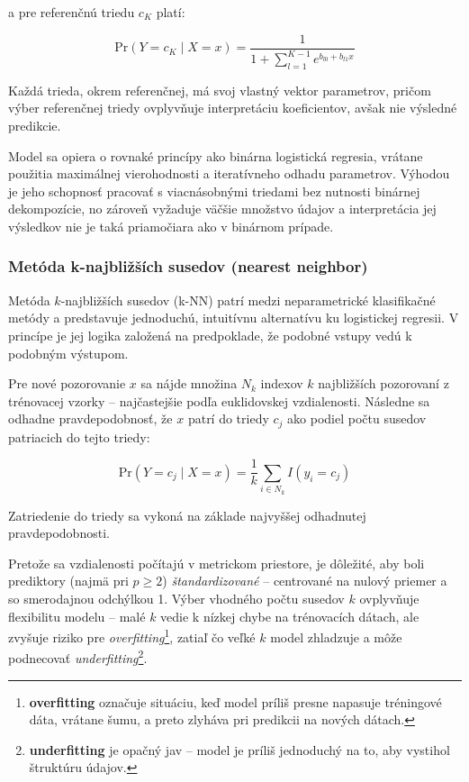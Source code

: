 a pre referenčnú triedu $c_K$ platí:

\begin{equation}
\mathrm{Pr}(Y = c_K \mid X = x) = \frac{1}{1 + \sum\limits_{l=1}^{K-1} e^{b_{l0} + b_{l1} x}}
\end{equation}

Každá trieda, okrem referenčnej, má svoj vlastný vektor parametrov, pričom výber referenčnej triedy ovplyvňuje interpretáciu koeficientov, avšak nie výsledné predikcie.

Model sa opiera o rovnaké princípy ako binárna logistická regresia, vrátane použitia maximálnej vierohodnosti a iteratívneho odhadu parametrov. Výhodou je jeho schopnosť pracovať s viacnásobnými triedami bez nutnosti binárnej dekompozície, no zároveň vyžaduje väčšie množstvo údajov a interpretácia jej výsledkov nie je taká priamočiara ako v binárnom prípade.

\subsubsection{Metóda k-najbližších susedov (nearest neighbor)}
\label{subsubsec:knn}

Metóda $k$-najbližších susedov (k-NN) patrí medzi neparametrické klasifikačné metódy a predstavuje jednoduchú, intuitívnu alternatívu ku logistickej regresii. V princípe je jej logika založená na predpoklade, že podobné vstupy vedú k podobným výstupom.

Pre nové pozorovanie $x$ sa nájde množina $N_k$ indexov $k$ najbližších pozorovaní z trénovacej vzorky – najčastejšie podľa euklidovskej vzdialenosti. Následne sa odhadne pravdepodobnosť, že $x$ patrí do triedy $c_j$ ako podiel počtu susedov patriacich do tejto triedy:

\begin{equation}
\mathrm{Pr}(Y = c_j \mid X = x) = \frac{1}{k} \sum_{i \in N_k} I(y_i = c_j)
\end{equation}

Zatriedenie do triedy sa vykoná na základe najvyššej odhadnutej pravdepodobnosti.

Pretože sa vzdialenosti počítajú v metrickom priestore, je dôležité, aby boli prediktory (najmä pri $p \geq 2$) \textit{štandardizované} – centrované na nulový priemer a so smerodajnou odchýlkou 1. Výber vhodného počtu susedov $k$ ovplyvňuje flexibilitu modelu – malé $k$ vedie k nízkej chybe na trénovacích dátach, ale zvyšuje riziko pre \textit{overfitting}\footnote{%
\textbf{overfitting} označuje situáciu, keď model príliš presne napasuje tréningové dáta, vrátane šumu, a preto zlyháva pri predikcii na nových dátach.}, zatiaľ čo veľké $k$ model zhladzuje a môže podnecovať \textit{underfitting}\footnote{\textbf{underfitting} je opačný jav – model je príliš jednoduchý na to, aby vystihol štruktúru údajov.}.

